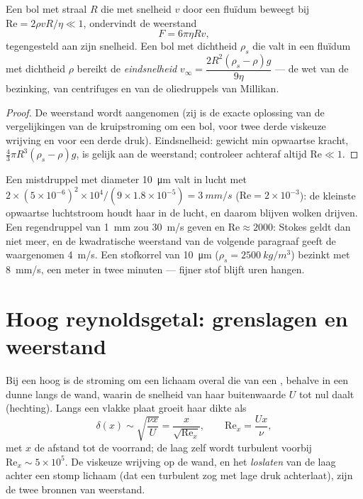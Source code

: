 \begin{proposition}\label{prop:b2:viscous-flows:stokes}
Een bol met straal $R$ die met snelheid $v$ door een fluïdum beweegt bij
$\mathrm{Re} = 2\rho vR/\eta \ll 1$, ondervindt de weerstand
\[
F = 6\pi\eta Rv ,
\]
tegengesteld aan zijn snelheid. Een bol met dichtheid $\rho_s$ die valt in
een fluïdum met dichtheid $\rho$ bereikt de \emph{eindsnelheid}
$v_\infty =
\dfrac{2R^2(\rho_s - \rho)g}{9\eta}$ --- de wet van de
bezinking, van centrifuges en van de oliedruppels van Millikan.
\end{proposition}

\begin{proof}
De weerstand wordt aangenomen (zij is de exacte oplossing van de
vergelijkingen van de kruipstroming om een bol, voor twee derde viskeuze
wrijving en voor een derde druk). Eindsnelheid: gewicht min opwaartse
kracht, $\tfrac43\pi R^3(\rho_s -
\rho)g$, is gelijk aan de weerstand;
controleer achteraf altijd $\mathrm{Re} \ll 1$.
\end{proof}

\begin{example}\label{ex:b2:viscous-flows:fog}
Een mistdruppel met diameter \qty{10}{\micro m} valt in lucht met
$2 \times (5 \times
10^{-6})^2 \times 10^4/(9 \times 1.8 \times 10^{-5}) = \qty{3}{mm/s}$
($\mathrm{Re} = 2 \times
10^{-3}$): de kleinste opwaartse luchtstroom houdt
haar in de lucht, en daarom blijven wolken drijven. Een regendruppel van
\qty{1}{mm} zou \qty{30}{m/s} geven en $\mathrm{Re} \approx 2000$: Stokes
geldt dan niet meer, en de kwadratische weerstand van de volgende paragraaf
geeft de waargenomen \qty{4}{m/s}. Een stofkorrel van \qty{10}{\micro m}
($\rho_s =
\qty{2500}{kg/m^3}$) bezinkt met \qty{8}{mm/s}, een meter in twee
minuten --- fijner stof blijft uren hangen.
\end{example}

\section{Hoog reynoldsgetal: grenslagen en weerstand}

\begin{proposition}[De grenslaag]\label{prop:b2:viscous-flows:bl}
Bij een hoog  is de stroming om een lichaam overal die van een
, behalve in een dunne \emph{} langs de wand,
waarin de snelheid van haar buitenwaarde $U$ tot nul daalt (hechting). Langs
een vlakke plaat groeit haar dikte als
\[
\delta(x) \sim \sqrt{\frac{\nu x}{U}} = \frac{x}{\sqrt{\mathrm{Re}_x}} ,
\qquad \mathrm{Re}_x = \frac{Ux}{\nu} ,
\]
met $x$ de afstand tot de voorrand; de laag zelf wordt turbulent voorbij
$\mathrm{Re}_x \sim 5 \times 10^5$. De viskeuze wrijving op de wand, en het
\emph{loslaten} van de laag achter een stomp lichaam (dat een turbulent zog
met lage druk achterlaat), zijn de twee bronnen van weerstand.
\end{proposition}

